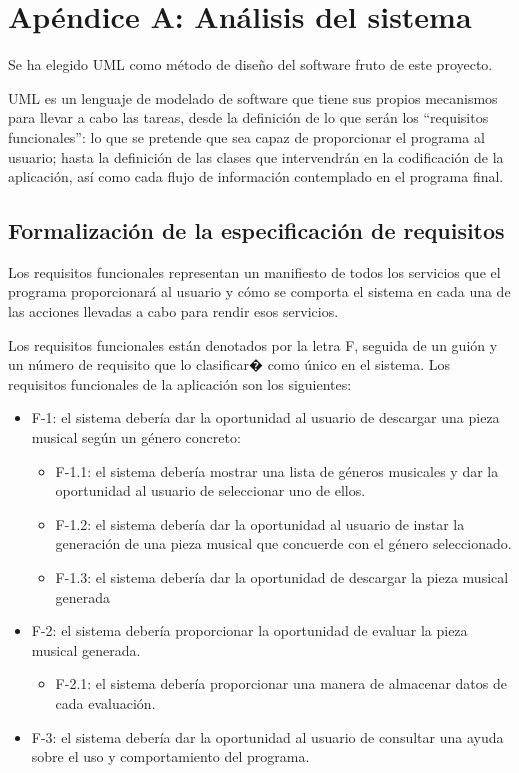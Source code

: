 \chapter{Apéndice A: Análisis del sistema}
\label{apendice-a}

Se ha elegido UML como método de diseño del software fruto de este proyecto.

UML es un lenguaje de modelado de software que tiene sus propios mecanismos para llevar a cabo las tareas, desde la definición de lo
que serán los ``requisitos funcionales'': lo que se pretende que sea capaz de proporcionar el programa al usuario; hasta la definición de las clases que intervendrán en la codificación de la aplicación, así como cada flujo de información contemplado en el programa final.

\section{Formalización de la especificación de requisitos}

Los requisitos funcionales representan un manifiesto de todos los servicios que el programa proporcionará al usuario y cómo se comporta el sistema en cada una de las acciones llevadas a cabo para rendir esos servicios.

Los requisitos funcionales están denotados por la letra F, seguida de un guión y un número de requisito que lo clasificar� como único en el sistema. Los requisitos funcionales de la aplicación son los siguientes:

\begin{itemize}

    \item F-1: el sistema debería dar la oportunidad al usuario de descargar una pieza musical según un género concreto:
    \begin{itemize}
        \item F-1.1: el sistema debería mostrar una lista de géneros musicales y dar la oportunidad al usuario de seleccionar uno de ellos.
        \item F-1.2: el sistema debería dar la oportunidad al usuario de instar la generación de una pieza musical que concuerde con el género seleccionado.
        \item F-1.3: el sistema debería dar la oportunidad de descargar la pieza musical generada
    \end{itemize}
    
    \item F-2: el sistema debería proporcionar la oportunidad de evaluar la pieza musical generada.
    \begin{itemize}
        \item F-2.1: el sistema debería proporcionar una manera de almacenar datos de cada evaluación.
    \end{itemize}
       
    \item F-3: el sistema debería dar la oportunidad al usuario de consultar una ayuda sobre el uso y comportamiento del programa.

\end{itemize}

